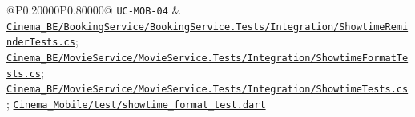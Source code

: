 \begin{longtable}{@{}P{0.20000\SRSWidth}P{0.80000\SRSWidth}@{}}
\texttt{UC-\allowbreak{}MOB-\allowbreak{}04} & \href{../../../Cinema\_BE/BookingService/BookingService.Tests/Integration/ShowtimeReminderTests.cs}{\texttt{Cinema\_\allowbreak{}BE/\allowbreak{}Booking\allowbreak{}Service/\allowbreak{}Booking\allowbreak{}Service.\allowbreak{}Tests/\allowbreak{}Integrat\allowbreak{}ion/\allowbreak{}Showtime\allowbreak{}Reminder\allowbreak{}Tests.\allowbreak{}cs}}; \href{../../../Cinema\_BE/MovieService/MovieService.Tests/Integration/ShowtimeFormatTests.cs}{\texttt{Cinema\_\allowbreak{}BE/\allowbreak{}Movie\allowbreak{}Service/\allowbreak{}Movie\allowbreak{}Service.\allowbreak{}Tests/\allowbreak{}Integrat\allowbreak{}ion/\allowbreak{}Showtime\allowbreak{}Format\allowbreak{}Tests.\allowbreak{}cs}}; \href{../../../Cinema\_BE/MovieService/MovieService.Tests/Integration/ShowtimeTests.cs}{\texttt{Cinema\_\allowbreak{}BE/\allowbreak{}Movie\allowbreak{}Service/\allowbreak{}Movie\allowbreak{}Service.\allowbreak{}Tests/\allowbreak{}Integrat\allowbreak{}ion/\allowbreak{}Showtime\allowbreak{}Tests.\allowbreak{}cs}}; \href{../../../Cinema\_Mobile/test/showtime\_format\_test.dart}{\texttt{Cinema\_\allowbreak{}Mobile/\allowbreak{}test/\allowbreak{}showtime\allowbreak{}\_\allowbreak{}format\_\allowbreak{}test.\allowbreak{}dart}} \\[3pt]

\end{longtable}
